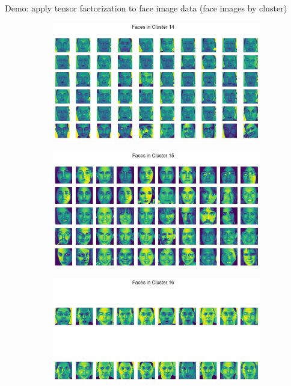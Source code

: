 \documentclass[xcolor={dvipsnames,svgnames}]{beamer}
\begin{document}
\begin{frame}{Demo: apply tensor factorization to face image data (face images by cluster)}
      \begin{figure}[H]
            \centering
            \begin{subfigure}[b]{0.45\textwidth}
                \includegraphics[width=\textwidth]{figures-face-results/face14.png}
            \end{subfigure}
            \hfill 
            \begin{subfigure}[b]{0.45\textwidth}
                \includegraphics[width=\textwidth]{figures-face-results/face15.png}
            \end{subfigure}
            \hfill
            \begin{subfigure}[b]{0.45\textwidth}
                \includegraphics[width=\textwidth]{figures-face-results/face16.png}

\end{subfigure}
\end{figure}
\end{frame}
\end{document}
